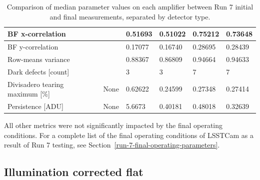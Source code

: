 \begin{table}[ht]
{\begin{tabular}{|l|l|ll|ll|}
BF x-correlation                  &                                & \multicolumn{1}{l|}{0.51693}              &     0.51022        & \multicolumn{1}{l|}{0.75212}              &       0.73648      \\ \hline
BF y-correlation                  &                                & \multicolumn{1}{l|}{0.17077}              &       0.16740      & \multicolumn{1}{l|}{0.28695}              &        0.28439     \\ \hline
Row-means variance                &                                & \multicolumn{1}{l|}{0.88367}              &      0.86809       & \multicolumn{1}{l|}{0.94664}              &        0.94633     \\ \hline
Dark defects {[}count{]}          &                                & \multicolumn{1}{l|}{3}              &       3      & \multicolumn{1}{l|}{7}              &       7      \\ \hline
Divisadero tearing maximum {[}\%{]} &     None                     & \multicolumn{1}{l|}{0.62622}              &       0.24599      & \multicolumn{1}{l|}{0.27348}              &       0.27414      \\ \hline
Persistence {[}ADU{]}             &       None                         & \multicolumn{1}{l|}{5.6673}              &       0.40181      & \multicolumn{1}{l|}{0.48018}              &       0.32639      \\ \hline
\end{tabular}
}
\caption{Comparison of median parameter values on each amplifier between Run 7 initial and final measurements, separated by detector type.}
\label{table:FinalChar-paramTable}
\end{table}

All other metrics were not significantly impacted by the final operating conditions. For a complete list of the final operating conditions of LSSTCam as a result of Run 7 testing, see Section~\ref{run-7-final-operating-parameters}.

\subsection{Illumination corrected flat}

